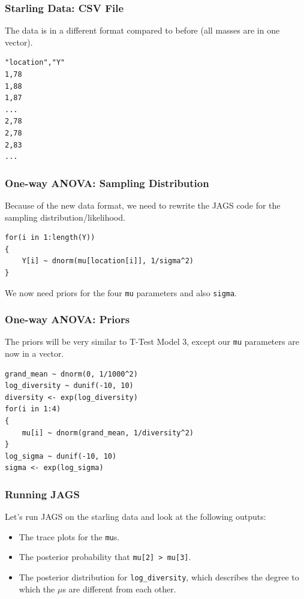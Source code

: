 \documentclass{beamer}
\begin{document}
\begin{frame}[fragile]
\frametitle{Starling Data: CSV File}
The data is in a different format compared to before (all masses are in one
vector).
\begin{verbatim}
"location","Y"
1,78
1,88
1,87
...
2,78
2,78
2,83
...
\end{verbatim}

\end{frame}


\begin{frame}[fragile]
\frametitle{One-way ANOVA: Sampling Distribution}
Because of the new data format, we need to rewrite the JAGS
code for the sampling distribution/likelihood.

\begin{verbatim}
for(i in 1:length(Y))
{
    Y[i] ~ dnorm(mu[location[i]], 1/sigma^2)
}
\end{verbatim}
\pause
We now need priors for the four \texttt{mu} parameters
and also \texttt{sigma}.

\end{frame}


\begin{frame}[fragile]
\frametitle{One-way ANOVA: Priors}
The priors will be very similar to T-Test Model 3, except our
\texttt{mu} parameters are now in a vector.
\footnotesize
\begin{verbatim}
grand_mean ~ dnorm(0, 1/1000^2)
log_diversity ~ dunif(-10, 10)
diversity <- exp(log_diversity)
for(i in 1:4)
{
    mu[i] ~ dnorm(grand_mean, 1/diversity^2)
}
log_sigma ~ dunif(-10, 10)
sigma <- exp(log_sigma)
\end{verbatim}

\end{frame}


\begin{frame}[fragile]
\frametitle{Running JAGS}
Let's run JAGS on the starling data and look at the following outputs:

\begin{itemize}
\item The trace plots for the \texttt{mu}s.\pause
\item The posterior probability that \texttt{mu[2] > mu[3]}.\pause
\item The posterior distribution for \texttt{log_diversity},
which describes the degree to which the $\mu$s are different from each other.
\end{itemize}


\end{frame}
\end{document}
